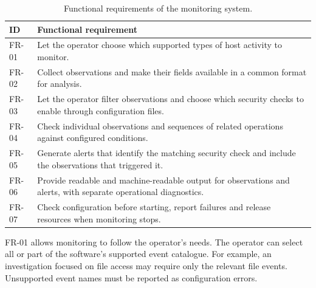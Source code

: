   \begin{table}[H]
      \centering
      \small
      \renewcommand{\arraystretch}{1.18}
      \begin{tabularx}{\textwidth}{
          @{}
          >{\raggedright\arraybackslash}p{}
          >{\raggedright\arraybackslash}X
          @{}
      }
          \toprule
          \textbf{ID} & \textbf{Functional requirement} \\
          \midrule

          FR-01 &
          Let the operator choose which supported types of host activity
          to monitor. \\

          FR-02 &
          Collect observations and make their fields available in a common
          format for analysis. \\

          FR-03 &
          Let the operator filter observations and choose which security
          checks to enable through configuration files. \\

          FR-04 &
          Check individual observations and sequences of related operations
          against configured conditions. \\

          FR-05 &
          Generate alerts that identify the matching security check and
          include the observations that triggered it. \\

          FR-06 &
          Provide readable and machine-readable output for observations
          and alerts, with separate operational diagnostics. \\

          FR-07 &
          Check configuration before starting, report failures and release
          resources when monitoring stops. \\

          \bottomrule
      \end{tabularx}
      \caption{Functional requirements of the monitoring system.}
      \label{tab:functional-requirements}
  \end{table}

  FR-01 allows monitoring to follow the operator's needs. The operator can
  select all or part of the software's supported event catalogue. 
  For example, an investigation focused on file access may require only the 
  relevant file events. Unsupported event names must be reported as configuration errors.

